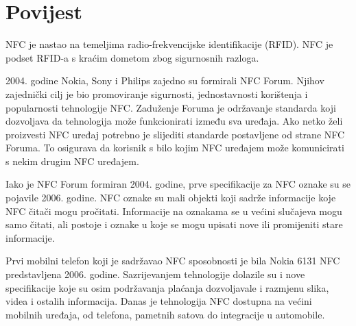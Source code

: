 \documentclass[times, utf8, zavrsni]{fer}
\begin{document}
\section{Povijest}
NFC je nastao na temeljima radio-frekvencijske identifikacije (RFID). NFC je podset RFID-a s kraćim dometom zbog sigurnosnih razloga.\par 
2004. godine Nokia, Sony i Philips zajedno su formirali NFC Forum. Njihov zajednički cilj je bio promoviranje sigurnosti, jednostavnosti korištenja i popularnosti tehnologije NFC. Zaduženje Foruma je održavanje standarda koji dozvoljava da tehnologija može funkcionirati između sva uređaja. Ako netko želi proizvesti NFC uređaj potrebno je slijediti standarde postavljene od strane NFC Foruma. To osigurava da korisnik s bilo kojim NFC uređajem može komunicirati s nekim drugim NFC uređajem.\par
Iako je NFC Forum formiran 2004. godine, prve specifikacije za NFC oznake su se pojavile 2006. godine. NFC oznake su mali objekti koji sadrže informacije koje NFC čitači mogu pročitati. Informacije na oznakama se u većini slučajeva mogu samo čitati, ali postoje i oznake u koje se mogu upisati nove ili promijeniti stare informacije.\par 
Prvi mobilni telefon koji je sadržavao NFC sposobnosti je bila Nokia 6131 NFC predstavljena 2006. godine. Sazrijevanjem tehnologije dolazile su i nove specifikacije koje su osim podržavanja plaćanja dozvoljavale i razmjenu slika, videa i ostalih informacija. Danas je tehnologija NFC dostupna na većini mobilnih uređaja, od telefona, pametnih satova do integracije u automobile.
\citep{3}
\end{document}
